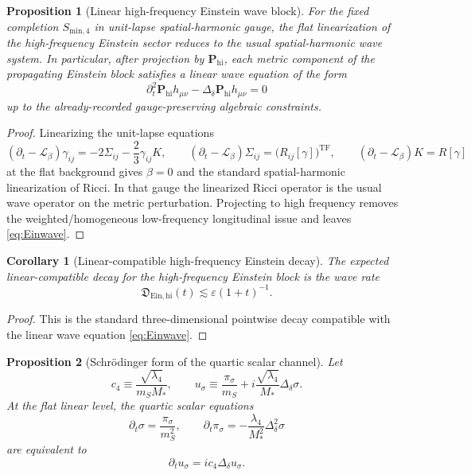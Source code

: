 \documentclass[11pt]{article}
\newcommand{\Ell}{\mathcal{L}}
\newtheorem{proposition}{Proposition}
\newtheorem{corollary}{Corollary}
\begin{document}
\begin{proposition}[Linear high-frequency Einstein wave block]
\label{prop:Einwave}
For the fixed completion \(S_{\mathrm{min},4}\) in unit-lapse spatial-harmonic gauge, the flat linearization of the high-frequency Einstein sector reduces to the usual spatial-harmonic wave system. In particular, after projection by \(\mathbf P_{\mathrm{hi}}\), each metric component of the propagating Einstein block satisfies a linear wave equation of the form
\begin{equation}
\partial_t^2 \mathbf P_{\mathrm{hi}}h_{\mu\nu}
-\Delta_\delta \mathbf P_{\mathrm{hi}}h_{\mu\nu}
=0
\label{eq:Einwave}
\end{equation}
up to the already-recorded gauge-preserving algebraic constraints.
\end{proposition}

\begin{proof}
Linearizing the unit-lapse equations
\[
(\partial_t-\Ell_\beta)\gamma_{ij}
=
-2\Sigma_{ij}
-\frac23\gamma_{ij}K,
\qquad
(\partial_t-\Ell_\beta)\Sigma_{ij}
=
\bigl(R_{ij}[\gamma]\bigr)^{\mathrm{TF}},
\qquad
(\partial_t-\Ell_\beta)K
=
R[\gamma]
\]
at the flat background gives \(\beta=0\) and the standard spatial-harmonic linearization of Ricci. In that gauge the linearized Ricci operator is the usual wave operator on the metric perturbation. Projecting to high frequency removes the weighted/homogeneous low-frequency longitudinal issue and leaves \eqref{eq:Einwave}.
\end{proof}

\begin{corollary}[Linear-compatible high-frequency Einstein decay]
\label{cor:Eindecay}
The expected linear-compatible decay for the high-frequency Einstein block is the wave rate
\begin{equation}
\mathfrak D_{\mathrm{Ein,hi}}(t)\lesssim \varepsilon(1+t)^{-1}.
\label{eq:Einrate}
\end{equation}
\end{corollary}

\begin{proof}
This is the standard three-dimensional pointwise decay compatible with the linear wave equation \eqref{eq:Einwave}.
\end{proof}

\begin{proposition}[Schr\"odinger form of the quartic scalar channel]
\label{prop:Schr}
Let
\begin{equation}
c_4 \equiv \frac{\sqrt{\lambda_4}}{m_SM_*},
\qquad
u_\sigma
\equiv
\frac{\pi_\sigma}{m_S}
+ i\frac{\sqrt{\lambda_4}}{M_*}\Delta_\delta\sigma.
\label{eq:usigma}
\end{equation}
At the flat linear level, the quartic scalar equations
\begin{equation}
\partial_t\sigma = \frac{\pi_\sigma}{m_S^2},
\qquad
\partial_t\pi_\sigma
=
-\frac{\lambda_4}{M_*^2}\Delta_\delta^2\sigma
\label{eq:scalarl}
\end{equation}
are equivalent to
\begin{equation}
\partial_t u_\sigma = i c_4 \Delta_\delta u_\sigma.
\label{eq:schr}
\end{equation}
\end{proposition}
\end{document}
